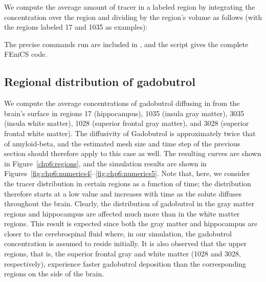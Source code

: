 \noindent We compute the average amount of tracer in a labeled region by
integrating the concentration over the region and dividing by the
region's volume as follows (with the regions labeled 17 and 1035 as
examples):

\noindent The precise commands run are included in
, and the script
 gives the complete
FEniCS code.

\subsection{Regional distribution of gadobutrol}
We compute the average concentrations of gadobutrol diffusing in from
the brain's surface in regions 17 (hippocampus), 1035 (insula gray
matter), 3035 (insula white matter), 1028 (superior frontal gray
matter), and 3028 (superior frontal white matter). The diffusivity of
Gadobutrol is approximately twice that of amyloid-beta, and the
estimated mesh size and time step of the previous section should
therefore apply to this case as well. The resulting curves are shown
in Figure~\ref{chp6:regions}, and the simulation results are shown in
Figures~\ref{fig:chp6:numerics4}--\ref{fig:chp6:numerics5}. Note that,
here, we consider the tracer distribution in certain regions as a
function of time; the distribution therefore starts at a low value and
increases with time as the solute diffuses throughout the
brain. Clearly, the distribution of gadobutrol in the gray matter
regions and hippocampus are affected much more than in the white
matter regions. This result is expected since both the gray matter and
hippocampus are closer to the cerebrospinal fluid where, in our
simulation, the gadobutrol concentration is assumed to reside
initially. It is also observed that the upper regions, that is, the
superior frontal gray and white matter (1028 and 3028, respectively),
experience faster gadobutrol deposition than the corresponding regions
on the side of the brain.
